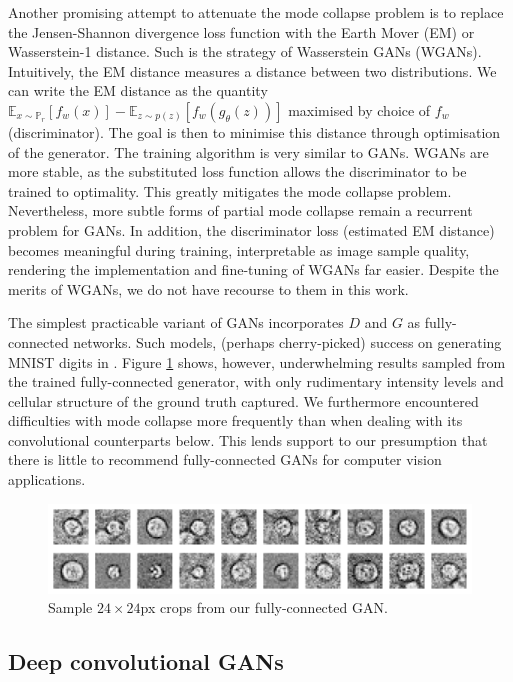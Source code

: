 Another promising attempt to attenuate the mode collapse problem is to replace the Jensen-Shannon divergence loss function with the Earth Mover (EM) or Wasserstein-1 distance. Such is the strategy of Wasserstein GANs (WGANs). Intuitively, the EM distance measures a distance between two distributions. We can write the EM distance as the quantity $\mathbb{E}_{x \sim \mathbb{P}_r}[f_w(x)] - \mathbb{E}_{z\sim p(z)}[f_w(g_{\theta}(z))]$ maximised by choice of $f_w$ (discriminator). The goal is then to minimise this distance through optimisation of the generator. The training algorithm is very similar to GANs. WGANs are more stable, as the substituted loss function allows the discriminator to be trained to optimality. This greatly mitigates the mode collapse problem. Nevertheless, more subtle forms of partial mode collapse remain a recurrent problem for GANs. In addition, the discriminator loss (estimated EM distance) becomes meaningful during training, interpretable as image sample quality, rendering the implementation and fine-tuning of WGANs far easier. Despite the merits of WGANs, we do not have recourse to them in this work.

The simplest practicable variant of GANs incorporates $D$ and $G$ as fully-connected networks. Such models, (perhaps cherry-picked) success on generating MNIST digits in \cite{goodfellow2014generative}. Figure \ref{fig:gan_samples} shows, however, underwhelming results sampled from the trained fully-connected generator, with only rudimentary intensity levels and cellular structure of the ground truth captured. We furthermore encountered difficulties with mode collapse more frequently than when dealing with its convolutional counterparts below. This lends support to our presumption that there is little to recommend fully-connected GANs for computer vision applications.

\begin{figure}[h!]
\centering
\includegraphics[width=\textwidth]{img/feasibility_gan_samples.pdf}
\caption{Sample $24\times 24$px crops from our fully-connected GAN.}
\label{fig:gan_samples}
\end{figure}

\subsection{Deep convolutional GANs}


